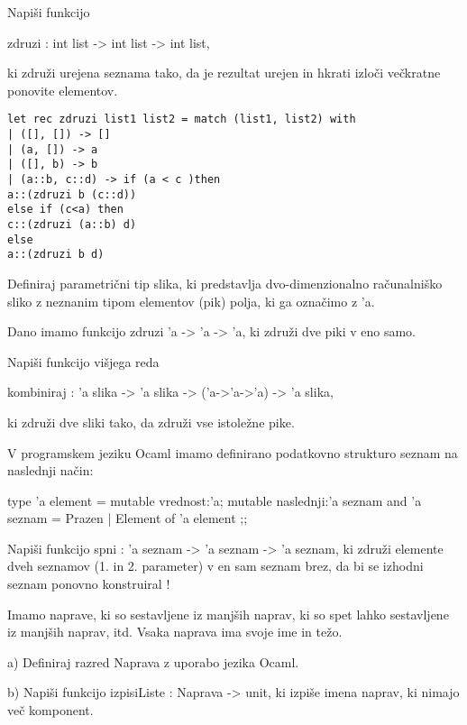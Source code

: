\begin{ex}
  Napi\v si funkcijo

  zdruzi : int list -> int list -> int list,

  ki zdru\v zi urejena seznama tako, da je rezultat urejen in hkrati
  izlo\v ci ve\v ckratne ponovite elementov.

\begin{sol}
\begin{verbatim}
let rec zdruzi list1 list2 = match (list1, list2) with
| ([], []) -> []
| (a, []) -> a
| ([], b) -> b
| (a::b, c::d) -> if (a < c )then 
a::(zdruzi b (c::d))
else if (c<a) then 
c::(zdruzi (a::b) d)
else 
a::(zdruzi b d)
\end{verbatim}
\end{sol}

\end{ex} 
\begin{ex}
  Definiraj parametri\v cni tip slika, ki predstavlja
  dvo-dimenzionalno ra\v cunalni\v sko sliko z neznanim tipom
  elementov (pik) polja, ki ga ozna\v cimo z 'a.

  Dano imamo funkcijo zdruzi 'a -> 'a -> 'a, ki zdru\v zi dve piki v
  eno samo.

  Napi\v si funkcijo vi\v sjega reda

  kombiniraj : 'a slika -> 'a slika -> ('a->'a->'a) -> 'a slika,

  ki zdru\v zi dve sliki tako, da zdru\v zi vse istole\v zne pike.


\end{ex} 
\begin{ex}
  V programskem jeziku Ocaml imamo definirano podatkovno strukturo
  seznam na naslednji na\v cin:

  type 'a element = { 
     mutable vrednost:'a; 
     mutable naslednji:'a seznam 
  }
  and 'a seznam = Prazen | Element of 'a element ;;

  Napi\v si funkcijo spni : 'a seznam -> 'a seznam -> 'a seznam, ki
  zdru\v zi elemente dveh seznamov (1. in 2. parameter) v en sam
  seznam brez, da bi se izhodni seznam ponovno konstruiral !


\end{ex} 
\begin{ex}
  Imamo naprave, ki so sestavljene iz manj\v sih naprav, ki so spet
  lahko sestavljene iz manj\v sih naprav, itd. Vsaka naprava ima svoje
  ime in te\v zo.
  
  a) Definiraj razred Naprava z uporabo jezika Ocaml.

  b) Napi\v si funkcijo izpisiListe : Naprava -> unit, ki izpi\v se
  imena naprav, ki nimajo ve\v c komponent.



\end{ex} 
